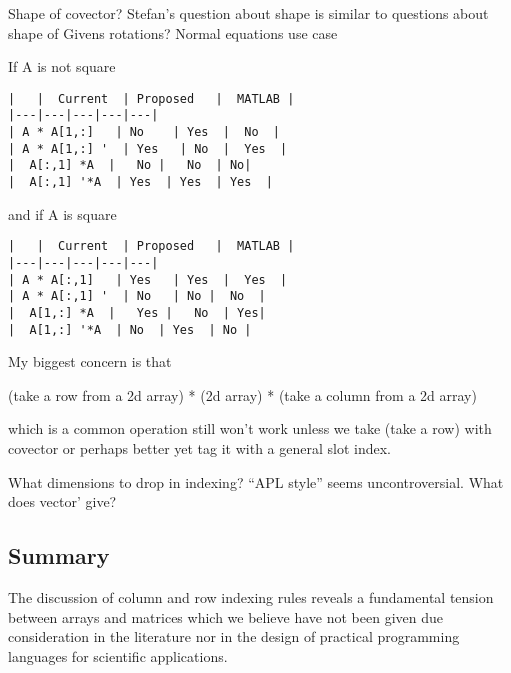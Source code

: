 Shape of covector?
Stefan's question about shape is similar to questions about shape of Givens rotations?
Normal equations use case


If A is not square


\begin{verbatim}
|   |  Current  | Proposed   |  MATLAB |
|---|---|---|---|---|
| A * A[1,:]   | No    | Yes  |  No  |
| A * A[1,:] '  | Yes   | No  |  Yes  |
|  A[:,1] *A  |   No |   No  | No|
|  A[:,1] '*A  | Yes  | Yes  | Yes  |
\end{verbatim}


and if A is square


\begin{verbatim}
|   |  Current  | Proposed   |  MATLAB |
|---|---|---|---|---|
| A * A[:,1]   | Yes   | Yes  |  Yes  |
| A * A[:,1] '  | No   | No |  No  |
|  A[1,:] *A  |   Yes |   No  | Yes|
|  A[1,:] '*A  | No  | Yes  | No |
\end{verbatim}

My biggest concern is that

(take a row from a 2d array) * (2d array) * (take a column from a 2d array)

which is a common operation still won't work unless we take
(take a row) with covector or perhaps better yet
tag it with a general slot index.

What dimensions to drop in indexing? ``APL style'' seems uncontroversial.
What does vector' give?


\subsection{Summary}

The discussion of column and row indexing rules reveals a fundamental tension
between arrays and matrices which we believe have not been given due
consideration in the literature nor in the design of practical programming
languages for scientific applications.
